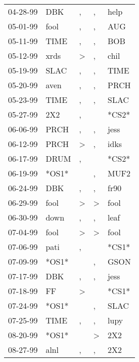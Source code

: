 \begin{supertabular}{lllll}
 04-28-99 &    DBK &                , &             , &   help \\
 05-01-99 &   fool &                , &             , &    AUG \\
 05-11-99 &   TIME &                , &             , &    BOB \\
 05-12-99 &   xrds &     \textgreater &             , &   chil \\
 05-19-99 &   SLAC &                , &             , &   TIME \\
 05-20-99 &   aven &                , &             , &   PRCH \\
 05-23-99 &   TIME &                , &             , &   SLAC \\
 05-27-99 &    2X2 &                , &               &  *CS2* \\
 06-06-99 &   PRCH &                , &             , &   jess \\
 06-12-99 &   PRCH &     \textgreater &             , &   idks \\
 06-17-99 &   DRUM &                , &               &  *CS2* \\
 06-19-99 &  *OS1* &                  &             , &   MUF2 \\
 06-24-99 &    DBK &                , &             , &   fr90 \\
 06-29-99 &   fool &     \textgreater &  \textgreater &   fool \\
 06-30-99 &   down &                , &             , &   leaf \\
 07-04-99 &   fool &     \textgreater &  \textgreater &   fool \\
 07-06-99 &   pati &                , &               &  *CS1* \\
 07-09-99 &  *OS1* &                  &             , &   GSON \\
 07-17-99 &    DBK &                , &             , &   jess \\
 07-18-99 &     FF &     \textgreater &               &  *CS1* \\
 07-24-99 &  *OS1* &                  &             , &   SLAC \\
 07-25-99 &   TIME &                , &             , &   lupy \\
 08-20-99 &  *OS1* &                  &  \textgreater &    2X2 \\
 08-27-99 &   alnl &                , &             , &    2X2 \\

\end{supertabular}

